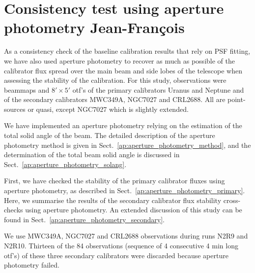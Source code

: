 
%





\section{Consistency test using aperture photometry {\color{blue} Jean-Fran\c cois}}
\label{se:aperture_photometry}

As a consistency check of the baseline calibration results that rely on PSF fitting, we have also used aperture photometry to recover as much as possible of the calibrator flux spread over the main beam and side
lobes of the telescope when assessing the stability of the calibration. 
For this study, observations were beammaps and $8' \times 5'$ otf's of the primary calibrators Uranus and Neptune
and of the secondary calibrators MWC349A, NGC7027 and CRL2688. All are
point-sources or quasi, except NGC7027 which is slightly extended.

We have implemented an aperture photometry relying on the estimation
of the total solid angle of the beam. The detailed description of the
aperture photometry method is given in
Sect.~\ref{ap:aperture_photometry_method}, and the determination of
the total beam solid angle is discussed in
Sect.~\ref{ap:aperture_photometry_solang}.

First, we have checked the stability of the primary calibrator fluxes
using aperture photometry, as described in
Sect.~\ref{ap:aperture_photometry_primary}. Here, we summarise the
results of the secondary calibrator flux stability cross-checks using
aperture photometry. An extended discussion of this study can be found
in Sect.~\ref{ap:aperture_photometry_secondary}.



We use MWC349A, NGC7027 and CRL2688 observations during runs N2R9 and N2R10.
Thirteen  of the 84 observations (sequence of 4 consecutive 4 min long
otf's) of these three secondary calibrators were discarded because
aperture photometry failed.

